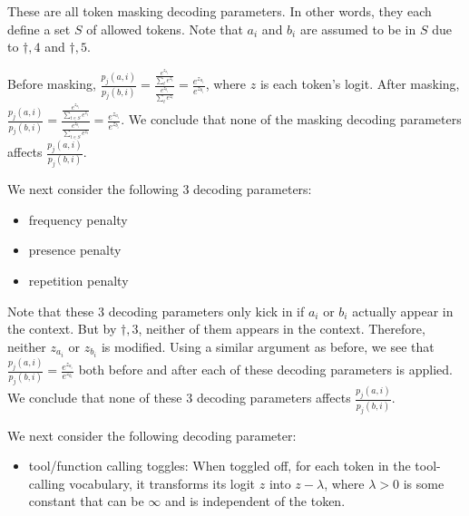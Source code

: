 \documentclass{article}
\begin{document}
These are all token masking decoding parameters. In other words, they each define a set $\displaystyle S$ of allowed tokens. Note that $\displaystyle a_{i}$ and $\displaystyle b_{i}$ are assumed to be in $\displaystyle S$ due to $\displaystyle \dagger ,4$ and $\displaystyle \dagger ,5$. 

Before masking, $\displaystyle \frac{p_{j}( a,i)}{p_{j}( b,i)} =\frac{\frac{e^{z_{a_{i}}}}{\sum _{t} e^{z_{t}}}}{\frac{e^{z_{b_{i}}}}{\sum _{t} e^{z_{t}}}} =\frac{e^{z_{a_{i}}}}{e^{z_{b_{i}}}}$, where $\displaystyle z$ is each token's logit. After masking, $\displaystyle \frac{p_{j}( a,i)}{p_{j}( b,i)} =\frac{\frac{e^{z_{a_{i}}}}{\sum _{t\in S} e^{z_{t}}}}{\frac{e^{z_{b_{i}}}}{\sum _{t\in S} e^{z_{t}}}} =\frac{e^{z_{a_{i}}}}{e^{z_{b_{i}}}}$. We conclude that none of the masking decoding parameters affects $\displaystyle \frac{p_{j}\left( a,i\right)}{p_{j}\left( b,i\right)}$.



We next consider the following 3 decoding parameters:
\begin{itemize}
\item frequency penalty
\item presence penalty
\item repetition penalty
\end{itemize}

Note that these 3 decoding parameters only kick in if $\displaystyle a_{i}$ or $\displaystyle b_{i}$ actually appear in the context. But by $\displaystyle \dagger ,3$, neither of them appears in the context. Therefore, neither $\displaystyle z_{a_{i}}$ or $\displaystyle z_{b_{i}}$ is modified. Using a similar argument as before, we see that $\displaystyle \frac{p_{j}\left( a,i\right)}{p_{j}\left( b,i\right)} =\frac{e^{z_{a_{i}}}}{e^{z_{b_{i}}}}$ both before and after each of these decoding parameters is applied. We conclude that none of these 3 decoding parameters affects $\displaystyle \frac{p_{j}\left( a,i\right)}{p_{j}\left( b,i\right)}$.



We next consider the following decoding parameter:
\begin{itemize}
\item tool/function calling toggles: When toggled off, for each token in the tool-calling vocabulary, it transforms its logit $\displaystyle z$ into $\displaystyle z-\lambda $, where $\displaystyle \lambda  >0$ is some constant that can be $\displaystyle \infty $ and is independent of the token.
\end{itemize}
\end{document}
